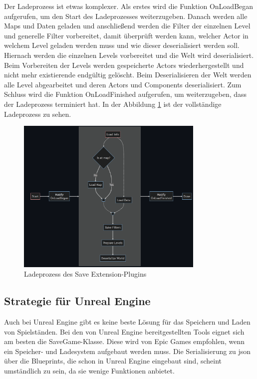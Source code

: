 Der Ladeprozess ist etwas komplexer. Als erstes wird die Funktion OnLoadBegan aufgerufen, um den Start des Ladeprozesses weiterzugeben. Danach werden alle Maps und Daten geladen und anschließend werden die Filter der einzelnen Level und generelle Filter vorbereitet, damit überprüft werden kann, welcher Actor in welchem Level geladen werden muss und wie dieser deserialisiert werden soll. Hiernach werden die einzelnen Levels vorbereitet und die Welt wird deserialisiert. Beim Vorbereiten der Levels werden gespeicherte Actors wiederhergestellt und nicht mehr existierende endgültig gelöscht. Beim Deserialisieren der Welt werden alle Level abgearbeitet und deren Actors und Components deserialisiert. Zum Schluss wird die Funktion OnLoadFinished aufgerufen, um weiterzugeben, dass der Ladeprozess terminiert hat. In der Abbildung \ref{fig:piperiftLoadProcess} ist der vollständige Ladeprozess zu sehen.\cite{piperiftLoadProcess}

\begin{figure}[htp]
    \centering
    \includegraphics[width=0.8\textwidth]{images/piperift_load_process.png}
    \caption{Ladeprozess des Save Extension-Plugins \cite{piperiftLoadProcess}}
    \label{fig:piperiftLoadProcess}
\end{figure}



\subsection{Strategie für Unreal Engine}
Auch bei Unreal Engine gibt es keine beste Lösung für das Speichern und Laden von Spielständen. Bei den von Unreal Engine bereitgestellten Tools eignet sich am besten die SaveGame-Klasse. Diese wird von Epic Games empfohlen, wenn ein Speicher- und Ladesystem aufgebaut werden muss. Die Serialisierung zu \ac{json} über die Blueprints, die schon in Unreal Engine eingebaut sind, scheint umständlich zu sein, da sie wenige Funktionen anbietet. 

